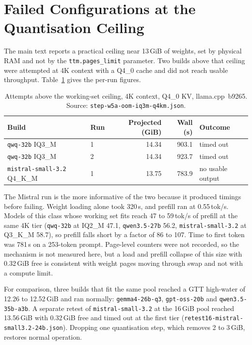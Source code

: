 \documentclass[11pt,a4paper]{article}
\begin{document}
\section{Failed Configurations at the Quantisation Ceiling}

The main text reports a practical ceiling near 13\,GiB of weights, set
by physical RAM and not by the \texttt{ttm.pages\_limit} parameter.  Two builds
above that ceiling were attempted at 4K context with a Q4\_0 cache and
did not reach usable throughput.  Table~\ref{tab:s-oom} gives the
per-run figures.

\begin{table}[h]
\centering\small
\caption{Attempts above the working-set ceiling, 4K context, Q4\_0 KV,
llama.cpp~b9265.  Source: \texttt{step-w5a-oom-iq3m-q4km.json}.}
\label{tab:s-oom}
\begin{tabular}{@{}llrrl@{}}
\toprule
\textbf{Build} & \textbf{Run} & \textbf{Projected (GiB)} & \textbf{Wall (s)} & \textbf{Outcome} \\
\midrule
\texttt{qwq-32b} IQ3\_M          & 1 & 14.34 & 903.1 & timed out \\
\texttt{qwq-32b} IQ3\_M          & 2 & 14.34 & 923.7 & timed out \\
\texttt{mistral-small-3.2} Q4\_K\_M & 1 & 13.75 & 783.9 & no usable output \\
\bottomrule
\end{tabular}
\end{table}

The Mistral run is the more informative of the two because it produced
timings before failing.  Weight loading alone took 320\,s, and prefill ran at 0.55\,tok/s.
Models of this class whose working set fits reach 47 to 59\,tok/s of
prefill at the same 4K tier (\texttt{qwq-32b} at IQ2\_M 47.1,
\texttt{qwen3.5-27b} 56.2, \texttt{mistral-small-3.2} at Q3\_K\_M 58.7),
so prefill falls short by a factor of 86 to 107.  Time to first token was 781\,s on a
253-token prompt.  Page-level counters were not recorded, so the mechanism is not measured
here, but a load and prefill collapse of this size with 0.32\,GiB free is
consistent with weight pages moving through swap and not with a
compute limit.

For comparison, three builds that fit the same pool reached a GTT
high-water of 12.26 to 12.52\,GiB and ran normally:
\texttt{gemma4-26b-q3}, \texttt{gpt-oss-20b} and
\texttt{qwen3.5-35b-a3b}.  A separate retest of
\texttt{mistral-small-3.2} at the 16\,GiB pool reached 13.56\,GiB with
0.32\,GiB free and timed out at the first tier
(\texttt{retest16-mistral-small3.2-24b.json}).  Dropping one
quantisation step, which removes 2 to 3\,GiB, restores normal
operation.
\end{document}
